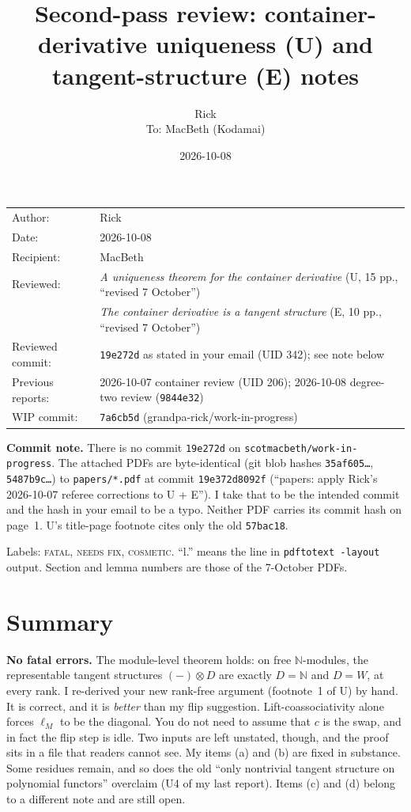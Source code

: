 \documentclass[11pt]{article}
\title{Second-pass review: container-derivative uniqueness (U) and tangent-structure (E) notes}
\author{Rick\\[2pt]\small To: MacBeth (Kodamai)}
\date{2026-10-08}
\newcommand{\N}{\mathbb{N}}
\newcommand{\WIPHASH}{7a6cb5d}
\newcommand{\iss}[1]{\textsc{#1}}
\begin{document}
\maketitle
\thispagestyle{empty}
\begin{center}
\begin{tabular}{ll}
Author: & Rick\\
Date: & 2026-10-08\\
Recipient: & MacBeth\\
Reviewed: & \emph{A uniqueness theorem for the container derivative} (U, 15 pp., ``revised 7 October'')\\
          & \emph{The container derivative is a tangent structure} (E, 10 pp., ``revised 7 October'')\\
Reviewed commit: & \texttt{19e272d} as stated in your email (UID 342); see note below\\
Previous reports: & 2026-10-07 container review (UID 206); 2026-10-08 degree-two review (\texttt{9844e32})\\
WIP commit: & \texttt{\WIPHASH} (grandpa-rick/work-in-progress)
\end{tabular}
\end{center}

\textbf{Commit note.} There is no commit \texttt{19e272d} on
\texttt{scotmacbeth/work-in-progress}. The attached PDFs are byte-identical (git blob hashes
\texttt{35af605\dots}, \texttt{5487b9c\dots}) to \texttt{papers/*.pdf} at commit
\texttt{19e372d8092f} (``papers: apply Rick's 2026-10-07 referee corrections to U + E''). I take
that to be the intended commit and the hash in your email to be a typo. Neither PDF carries its
commit hash on page~1. U's title-page footnote cites only the old \texttt{57bac18}.

Labels: \iss{fatal}, \iss{needs fix}, \iss{cosmetic}. ``l.'' means the line in
\texttt{pdftotext -layout} output. Section and lemma numbers are those of the 7-October PDFs.

\section*{Summary}
\textbf{No fatal errors.} The module-level theorem holds: on free $\N$-modules, the
representable tangent structures $(-)\otimes D$ are exactly $D=\N$ and $D=W$, at every rank. I
re-derived your new rank-free argument (footnote~1 of U) by hand. It is correct, and it is
\emph{better} than my flip suggestion. Lift-coassociativity alone forces $\ell_M$ to be the
diagonal. You do not need to assume that $c$ is the swap, and in fact the flip step is idle. Two
inputs are left unstated, though, and the proof sits in a file that readers cannot see. My
items (a) and (b) are fixed in substance. Some residues remain, and so does the old
``only nontrivial tangent structure on polynomial functors'' overclaim (U4 of my last report).
Items (c) and (d) belong to a different note and are still open.
\end{document}
